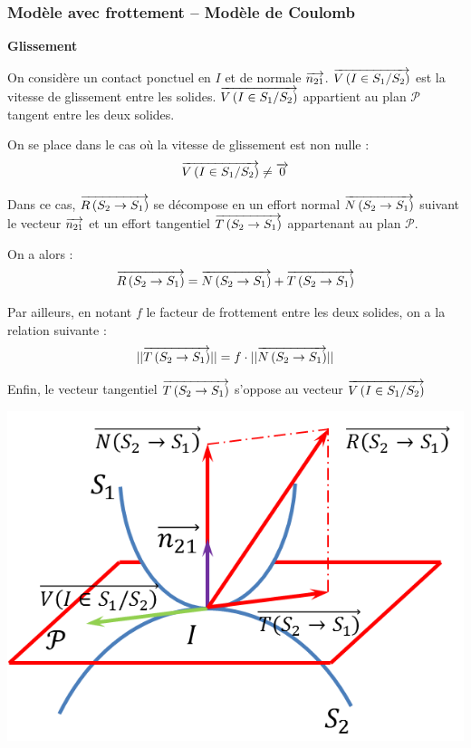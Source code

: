 \documentclass[10pt]{article}
\begin{document}
\subsubsection{Modèle avec frottement -- Modèle de Coulomb}
\begin{theo}
\textbf{Glissement}


On considère un contact ponctuel en $I$ et de normale $\overrightarrow{n_{21}}$. $\overrightarrow{V\left( {I} \in {S_1}/{S_2}\right)}$ est la vitesse de glissement entre les solides. $\overrightarrow{V\left( {I} \in {S_1}/{S_2}\right)}$ appartient au plan $\mathcal{P}$ tangent entre les deux solides.

On se place dans le cas où la vitesse de glissement est non nulle :
$$\overrightarrow{V\left( {I} \in {S_1}/{S_2}\right)}\neq \overrightarrow{0}$$

\begin{minipage}[c]{.6\linewidth}

Dans ce cas, $\overrightarrow{R\left( {S_2} \rightarrow {S_1}\right)}$ se décompose en un effort normal $\overrightarrow{N\left(S_2\rightarrow S_1\right)}$ suivant le vecteur $\overrightarrow{n_{21}}$ et un effort tangentiel $\overrightarrow{T\left(S_2\rightarrow S_1\right)}$ appartenant au plan $\mathcal{P}$.

On a alors :
$$
\overrightarrow{R\left( {S_2} \rightarrow {S_1}\right)} = \overrightarrow{N\left(S_2\rightarrow S_1\right)}+\overrightarrow{T\left(S_2\rightarrow S_1\right)}
$$ 

Par ailleurs, en notant $f$ le facteur de frottement entre les deux solides, on a la relation suivante :
$$
||\overrightarrow{T\left(S_2\rightarrow S_1\right)}|| = f\cdot ||\overrightarrow{N\left(S_2\rightarrow S_1\right)}||
$$

Enfin, le vecteur tangentiel $\overrightarrow{T\left(S_2\rightarrow S_1\right)}$ s'oppose au vecteur $\overrightarrow{V\left( {I} \in {S_1}/{S_2}\right)}$
\end{minipage}\hfill
\begin{minipage}[c]{.35\linewidth}
\begin{center}
\includegraphics[width=\textwidth]{images/coulomb}
\end{center}
\end{minipage}
\end{theo}
\end{document}
